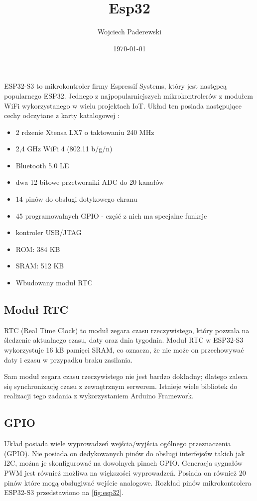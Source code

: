 \documentclass[../main.tex]{subfiles}
\author{Wojciech Paderewski}
\date{\today}
\title{Esp32}
\begin{document}
ESP32-S3 to mikrokontroler firmy Espressif Systems, który jest następcą popularnego ESP32.
Jednego z najpopularniejszych mikrokontrolerów z modułem WiFi wykorzystanego w wielu projektach IoT.
Układ ten posiada następujące cechy odczytane z karty katalogowej \cite{st:esp32}:

\begin{itemize}
\item 2 rdzenie Xtensa LX7 o taktowaniu 240 MHz
\item 2,4 GHz WiFi 4 (802.11 b/g/n)
\item Bluetooth 5.0 LE
\item dwa 12-bitowe przetworniki ADC do 20 kanałów
\item 14 pinów do obsługi dotykowego ekranu
\item 45 programowalnych GPIO - część z nich ma specjalne funkcje
\item kontroler USB/JTAG
\item ROM: 384 KB
\item SRAM: 512 KB
\item Wbudowany moduł RTC
\end{itemize}
\subsection{Moduł RTC}

RTC (Real Time Clock) to moduł zegara czasu rzeczywistego, który pozwala na śledzenie aktualnego czasu, daty oraz dnia tygodnia.
Moduł RTC w ESP32-S3 wykorzystuje 16 kB pamięci SRAM, co oznacza, że nie może on przechowywać daty i czasu w przypadku braku zasilania.

Sam moduł zegara czasu rzeczywistego nie jest bardzo dokładny; dlatego zaleca się synchronizację czasu z zewnętrznym serwerem.
Istnieje wiele bibliotek do realizacji tego zadania z wykorzystaniem Arduino Framework.
\subsection{GPIO}
Układ posiada wiele wyprowadzeń wejścia/wyjścia ogólnego przeznaczenia (GPIO). Nie posiada on dedykowanych pinów do obsługi interfejsów takich jak I2C, można 
je skonfigurować na dowolnych pinach GPIO. Generacja sygnałów PWM jest również możliwa na większości wyprowadzeń. Posiada on również 20 pinów które mogą
obsługiwać wejście analogowe. Rozkład pinów mikrokontrolera ESP32-S3 przedstawiono na \ref{fig:esp32}.
\end{document}
